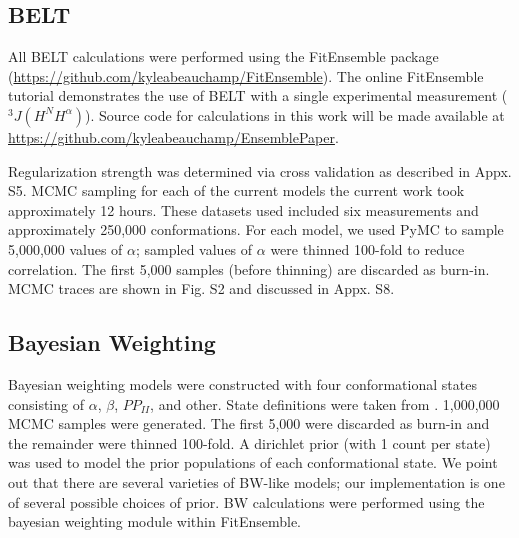 \documentclass[journal=jacsat,manuscript=article]{achemso}
\begin{document}
\subsection{BELT}

All BELT calculations were performed using the FitEnsemble package (\url{https://github.com/kyleabeauchamp/FitEnsemble}).  The online FitEnsemble tutorial demonstrates the use of BELT with a single experimental measurement ($^3J(H^N H^\alpha)$).  Source code for calculations in this work will be made available at \url{https://github.com/kyleabeauchamp/EnsemblePaper}.  

Regularization strength was determined via cross validation as described in Appx. S5.  MCMC sampling for each of the current models the current work took approximately 12 hours.  These datasets used included six measurements and approximately 250,000 conformations.  For each model, we used PyMC to sample 5,000,000 values of $\alpha$; sampled values of $\alpha$ were thinned 100-fold to reduce correlation.  The first 5,000 samples (before thinning) are discarded as burn-in.  MCMC traces are shown in Fig. S2 and discussed in Appx. S8.  

\subsection{Bayesian Weighting}

Bayesian weighting models were constructed with four conformational states consisting of $\alpha$, $\beta$, $PP_{II}$, and other.  State definitions were taken from \cite{jha}.  1,000,000 MCMC samples were generated.  The first 5,000 were discarded as burn-in and the remainder were thinned 100-fold.  A dirichlet prior (with 1 count per state) was used to model the prior populations of each conformational state.  We point out that there are several varieties of BW-like models; our implementation is one of several possible choices of prior.  BW calculations were performed using the bayesian weighting module within FitEnsemble.  



\end{document}
